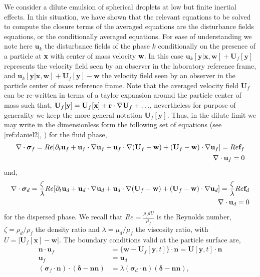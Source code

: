 We consider a dilute emulsion of spherical droplets at low but finite inertial effects. 
In this situation, we have shown that the relevant equations to be solved to compute the closure terms of the averaged equations are the disturbance fields equations, or the conditionally averaged equations. 
For ease of understanding we note here $\textbf{u}_k$ the disturbance fields of the phase $k$ conditionally on the presence of a particle at \textbf{x} with center of mass velocity \textbf{w}.
In this case $\textbf{u}_k[\textbf{y}|\textbf{x},\textbf{w}] + \textbf{U}_f[\textbf{y}]$ represents the velocity field seen by an observer in the laboratory reference frame, and $\textbf{u}_k[\textbf{y}|\textbf{x},\textbf{w}] + \textbf{U}_f[\textbf{y}] - \textbf{w}$ the velocity field seen by an observer in the particle center of mass reference frame.
Note that the averaged velocity field $\textbf{U}_f$ can be re-written in terms of a taylor expansion around the particle center of mass such that, $\textbf{U}_f[\textbf{y}] = \textbf{U}_f[\textbf{x}] + \textbf{r} \cdot \mathbf{\nabla} \textbf{U}_f + \ldots$, nevertheless for purpose of generality we keep the more general notation $\textbf{U}_f[\textbf{y}]$. 
Thus, in the dilute limit we may write in the dimensionless form the following set of equations (see \ref{ref:daniel2}, \citep{stone2001inertial}) for the fluid phase, 
\begin{align*}
    \mathbf{\nabla}\cdot\bm\sigma_f
    = 
    Re [
    \partial_t \textbf{u}_f
    + \textbf{u}_f\cdot \mathbf{\nabla} \textbf{u}_f
    + \textbf{u}_f\cdot \mathbf{\nabla} (\textbf{U}_f - \textbf{w})
    + (\textbf{U}_f - \textbf{w})\cdot \mathbf{\nabla} \textbf{u}_f]
    = Re \textbf{f}_f\\
    \mathbf{\nabla}\cdot \textbf{u}_f = 0
\end{align*}
and, 
\begin{align*}
    \mathbf{\nabla}\cdot\bm\sigma_d
    = 
    \frac{\zeta}{\lambda}Re [
    \partial_t \textbf{u}_d
    + \textbf{u}_d\cdot \mathbf{\nabla} \textbf{u}_d
    + \textbf{u}_d\cdot \mathbf{\nabla} (\textbf{U}_f - \textbf{w})
    + (\textbf{U}_f - \textbf{w})\cdot \mathbf{\nabla} \textbf{u}_d]
    = \frac{\zeta}{\lambda}Re \textbf{f}_d\\
    \mathbf{\nabla}\cdot \textbf{u}_d = 0
\end{align*}
for the dispersed phase. 
We recall that $Re = \frac{\rho_f d U}{\mu_f}$ is the Reynolds number, $\zeta = \rho_d / \rho_f$ the density ratio and $\lambda = \mu_d / \mu_f$ the viscosity ratio, with $U = |\textbf{U}_f[\textbf{x}] - \textbf{w}|$. 
The boundary conditions valid at the particle surface are, 
\begin{align}
    \textbf{n}\cdot\textbf{u}_f
    &= \{\textbf{w} - \textbf{U}_f[\textbf{y},t]\}\cdot \textbf{n} 
    = \textbf{U}[\textbf{y},t]\cdot \textbf{n} \\
    \textbf{u}_f &= \textbf{u}_d\\
    (\bm\sigma_f\cdot\textbf{n})\cdot (\bm\delta - \textbf{nn})
    &= \lambda (\bm\sigma_d\cdot \textbf{n})(\bm\delta - \textbf{nn}),
    \label{eq:bc_stress_orig}
\end{align}
